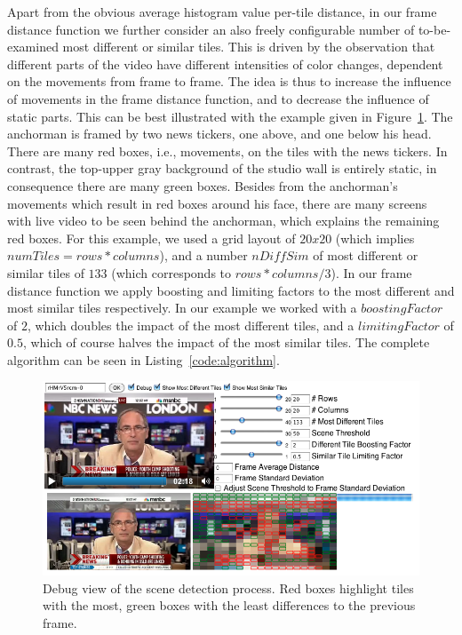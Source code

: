\documentclass[10pt,twocolumn,letterpaper]{article}
\begin{document}
Apart from the obvious average histogram value per-tile distance, in our frame distance function we further consider an also freely configurable number of to-be-examined most different or similar tiles. This is driven by the observation that different parts of the video have different intensities of color changes, dependent on the movements from frame to frame. The idea is thus to increase the influence of movements in the frame distance function, and to decrease the influence of static parts. This can be best illustrated with the example given in Figure~\ref{fig:algorithm}. The anchorman is framed by two news tickers, one above, and one below his head. There are many red boxes, i.e., movements, on the tiles with the news tickers. In contrast, the top-upper gray background of the studio wall is entirely static, in consequence there are many green boxes. Besides from the anchorman's movements which result in red boxes around his face, there are many screens with live video to be seen behind the anchorman, which explains the remaining red boxes. For this example, we used a grid layout of $20x20$ (which implies $numTiles = rows * columns$), and a number $nDiffSim$ of most different or similar tiles of $133$ (which corresponds to $rows * columns / 3$). In our frame distance function we apply boosting and limiting factors to the most different and most similar tiles respectively. In our example we worked with a $boostingFactor$ of $2$, which doubles the impact of the most different tiles, and a $limitingFactor$ of $0.5$, which of course halves the impact of the most similar tiles. The complete algorithm can be seen in Listing~\ref{code:algorithm}.

\begin{figure}
\begin{center}
   \includegraphics[width=1.0\linewidth]{./resources/algorithm.png}
\end{center}
   \caption{Debug view of the scene detection process. Red boxes highlight tiles with the most, green boxes with the least differences to the previous frame.}
\label{fig:algorithm}
\end{figure}
\end{document}

